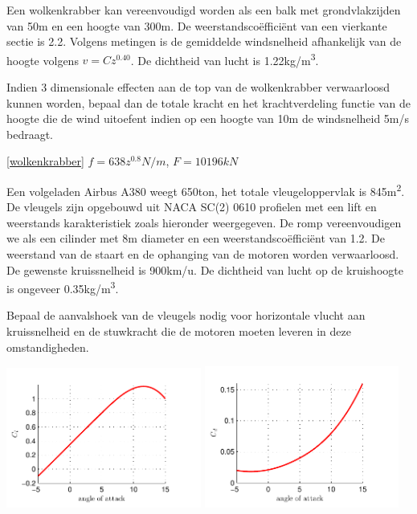 \begin{toepassing}
	\label{wolkenkrabber}
Een wolkenkrabber kan vereenvoudigd worden als een balk met grondvlakzijden van 50m en een hoogte van 300m. De weerstandscoëfficiënt van een vierkante sectie is 2.2. Volgens metingen is de gemiddelde windsnelheid afhankelijk van de hoogte volgens $v = C z^{0.40}$. De dichtheid van lucht is 1.22\unit{kg/m^3}.

Indien 3 dimensionale effecten aan de top van de wolkenkrabber verwaarloosd kunnen worden, bepaal dan de totale kracht en het krachtverdeling functie van de hoogte die de wind uitoefent indien op een hoogte van 10m de windsnelheid 5m/s bedraagt.
\end{toepassing}
\begin{antwoord}{\ref{wolkenkrabber}}
	$f = 638 z^{0.8} \unit{N/m}$, $F = 10196\unit{kN}$
\end{antwoord}
\begin{toepassing}[*]
	\label{airbus}
Een volgeladen Airbus A380 weegt 650ton, het totale vleugeloppervlak is 845\unit{m^2}. De vleugels zijn opgebouwd uit NACA SC(2) 0610 profielen met een lift en weerstands karakteristiek zoals hieronder weergegeven. De romp vereenvoudigen we als een cilinder met 8m diameter en een weerstandscoëfficiënt van 1.2. De weerstand van de staart en de ophanging van de motoren worden verwaarloosd. De gewenste kruissnelheid is 900km/u. De dichtheid van lucht op de kruishoogte is ongeveer 0.35\unit{kg/m^3}.
		
Bepaal de aanvalshoek van de vleugels nodig voor horizontale vlucht aan kruissnelheid en de stuwkracht die de motoren moeten leveren in deze omstandigheden.

	\centering
	\includegraphics[width=0.48\textwidth]{fig/uitwendige_stroming/NACA_SC(2)_0610_Cl.pdf}
	\includegraphics[width=0.48\textwidth]{fig/uitwendige_stroming/NACA_SC(2)_0610_Cd.pdf}
\end{toepassing}
